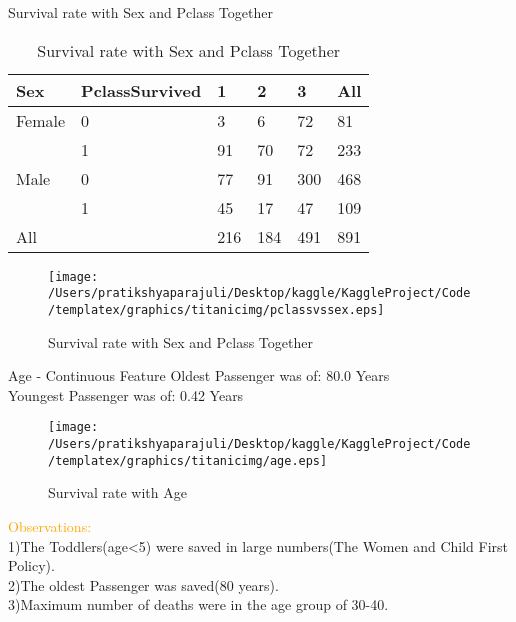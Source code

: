\documentclass[
 size=14pt,
 paper=smartboard,  %
 mode=present, 		%
 display=slides, 	%
 style=tuliplab,  	%
 pauseslide,
 fleqn,leqno]{powerdot}
\begin{document}
\begin{slide}[toc=,bm=]{Survival rate with Sex and Pclass Together}
  \setlength{\abovecaptionskip}{0pt}
  \setlength{\belowcaptionskip}{10pt}
  \centering
  \begin{table}[tb]
    \setlength{\abovecaptionskip}{0pt}
    \setlength{\belowcaptionskip}{10pt}
    \centering
    \caption{Survival rate with Sex and Pclass Together}
    
    \begin{tabular}{p{1.5cm}p{1.9cm}p{1.5cm}p{1.9cm}p{2.9cm}p{2.9cm}}
    \hline
     Sex  & PclassSurvived & 1 & 2 &3  & All \\
    \hline
      Female  & 0    & 3    &  6    &  72   & 81  \\
              & 1    & 91   &  70   &  72   & 233  \\
      Male    & 0    & 77   &  91   &  300  & 468  \\
              & 1    & 45   &  17   &  47   & 109  \\
      All     &      & 216  &  184  &  491  & 891  \\
    \hline
    \end{tabular}
    \end{table}
    \vspace{0.1cm}
\begin{figure}
  \centering
  \centerline{
    \texttt{[image: /Users/pratikshyaparajuli/Desktop/kaggle/KaggleProject/Code/templatex/graphics/titanicimg/pclassvssex.eps]}
    }
  \caption{Survival rate with Sex and Pclass Together}\label{fig:sexvspclass}
\end{figure}
\end{slide}
\begin{slide}[toc=,bm=]{Age - Continuous Feature}
  Oldest Passenger was of: 80.0 Years \\
  Youngest Passenger was of: 0.42 Years 
\vspace{0.1cm}
\begin{figure}
  \centering
  \centerline{
    \texttt{[image: /Users/pratikshyaparajuli/Desktop/kaggle/KaggleProject/Code/templatex/graphics/titanicimg/age.eps]}
    }
  \caption{Survival rate with Age }\label{fig:age}
\end{figure}
\textcolor{orange}{Observations:}\\
1)The Toddlers(age<5) were saved in large numbers(The Women and Child First Policy).\\
2)The oldest Passenger was saved(80 years).\\
3)Maximum number of deaths were in the age group of 30-40.
\end{slide}
\end{document}
